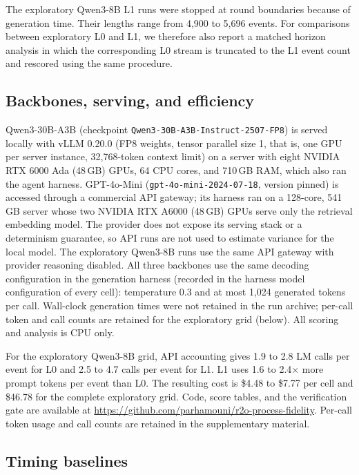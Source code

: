 The exploratory Qwen3-8B L1 runs were stopped at round boundaries because of
generation time. Their lengths range from 4,900 to 5,696 events. For
comparisons between exploratory L0 and L1, we therefore also report a
matched horizon analysis in which the corresponding L0 stream is truncated to
the L1 event count and rescored using the same procedure.

\subsection{Backbones, serving, and efficiency}

Qwen3-30B-A3B (checkpoint \texttt{Qwen3-30B-A3B-Instruct-2507-FP8}) is served
locally with vLLM 0.20.0 (FP8 weights, tensor parallel size 1, that is, one
GPU per server instance, 32,768-token context limit) on a server with eight
NVIDIA RTX 6000 Ada (48\,GB) GPUs, 64 CPU cores, and 710\,GB RAM, which also
ran the agent harness. GPT-4o-Mini (\texttt{gpt-4o-mini-2024-07-18}, version pinned) is
accessed through a commercial API gateway; its harness ran on a 128-core,
541\,GB server whose two NVIDIA RTX A6000 (48\,GB) GPUs serve only the
retrieval embedding model. The provider does not expose its serving stack or
a determinism guarantee, so API runs are not used to estimate variance for the
local model. The exploratory Qwen3-8B runs use the same API gateway with
provider reasoning disabled. All three backbones use the same decoding
configuration in the generation harness (recorded in the harness model
configuration of every cell): temperature 0.3 and at most 1,024 generated
tokens per call. Wall-clock generation times were not retained in
the run archive; per-call token and call counts are retained for the
exploratory grid (below). All scoring and analysis is CPU only.

For the exploratory Qwen3-8B grid, API accounting gives 1.9 to 2.8 LM calls per
event for L0 and 2.5 to 4.7 calls per event for L1. L1 uses 1.6 to 2.4$\times$
more prompt tokens per event than L0. The resulting cost is
\$4.48 to \$7.77 per cell and \$46.78 for the complete exploratory grid.
Code, score tables, and the verification gate are available at
\url{https://github.com/parhamouni/r2o-process-fidelity}. Per-call token usage and call counts are retained in the supplementary
material.

\subsection{Timing baselines}

